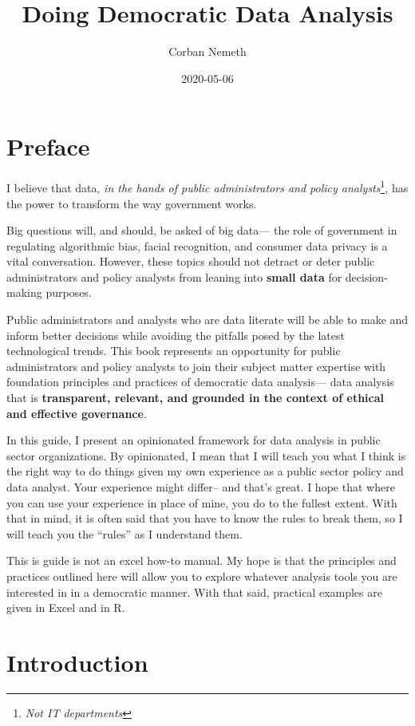 \documentclass[]{book}
\title{Doing Democratic Data Analysis}
\author{Corban Nemeth}
\date{2020-05-06}
\begin{document}
\maketitle

{
\setcounter{tocdepth}{1}
\tableofcontents
}
\hypertarget{preface}{%
\chapter*{Preface}\label{preface}}

I believe that data, \emph{in the hands of public administrators and policy analysts}\footnote{\emph{Not IT departments}}, has the power to transform the way government works.

Big questions will, and should, be asked of big data--- the role of government in regulating algorithmic bias, facial recognition, and consumer data privacy is a vital conversation. However, these topics should not detract or deter public administrators and policy analysts from leaning into \textbf{small data} for decision-making purposes.

Public administrators and analysts who are data literate will be able to make and inform better decisions while avoiding the pitfalls posed by the latest technological trends. This book represents an opportunity for public administrators and policy analysts to join their subject matter expertise with foundation principles and practices of democratic data analysis--- data analysis that is \textbf{transparent, relevant, and grounded in the context of ethical and effective governance}.

In this guide, I present an opinionated framework for data analysis in public sector organizations. By opinionated, I mean that I will teach you what I think is the right way to do things given my own experience as a public sector policy and data analyst. Your experience might differ-- and that's great. I hope that where you can use your experience in place of mine, you do to the fullest extent. With that in mind, it is often said that you have to know the rules to break them, so I will teach you the ``rules'' as I understand them.

This is guide is not an excel how-to manual. My hope is that the principles and practices outlined here will allow you to explore whatever analysis tools you are interested in in a democratic manner. With that said, practical examples are given in Excel and in R.

\hypertarget{intro}{%
\chapter{Introduction}\label{intro}}
\end{document}
